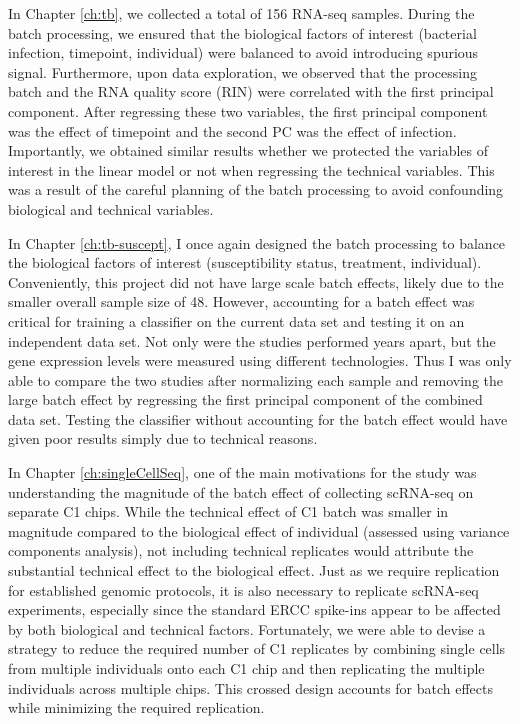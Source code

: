 In Chapter \ref{ch:tb}, we collected a total of 156 RNA-seq
samples. During the batch processing, we ensured that the biological
factors of interest (bacterial infection, timepoint, individual) were
balanced to avoid introducing spurious signal. Furthermore, upon data
exploration, we observed that the processing batch and the RNA quality
score (RIN) were correlated with the first principal component. After
regressing these two variables, the first principal component was the
effect of timepoint and the second PC was the effect of
infection. Importantly, we obtained similar results whether we
protected the variables of interest in the linear model or not when
regressing the technical variables. This was a result of the careful
planning of the batch processing to avoid confounding biological and
technical variables.

In Chapter \ref{ch:tb-suscept}, I once again designed the batch
processing to balance the biological factors of interest
(susceptibility status, treatment, individual). Conveniently, this
project did not have large scale batch effects, likely due to the
smaller overall sample size of 48. However, accounting for a batch
effect was critical for training a classifier on the current data set
and testing it on an independent data set. Not only were the studies
performed years apart, but the gene expression levels were measured
using different technologies. Thus I was only able to compare the two
studies after normalizing each sample and removing the large batch
effect by regressing the first principal component of the combined
data set. Testing the classifier without accounting for the batch
effect would have given poor results simply due to technical reasons.

In Chapter \ref{ch:singleCellSeq}, one of the main motivations for the
study was understanding the magnitude of the batch effect of
collecting scRNA-seq on separate C1 chips. While the technical effect
of C1 batch was smaller in magnitude compared to the biological effect
of individual (assessed using variance components analysis), not
including technical replicates would attribute the substantial
technical effect to the biological effect. Just as we require
replication for established genomic protocols, it is also necessary to
replicate scRNA-seq experiments, especially since the standard ERCC
spike-ins appear to be affected by both biological and technical
factors. Fortunately, we were able to devise a strategy to reduce the
required number of C1 replicates by combining single cells from
multiple individuals onto each C1 chip and then replicating the
multiple individuals across multiple chips. This crossed design
accounts for batch effects while minimizing the required replication.

